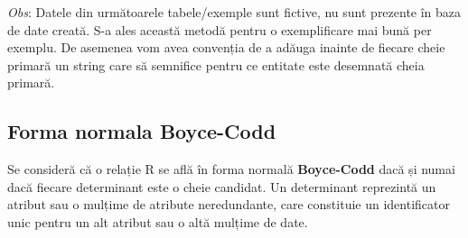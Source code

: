 \documentclass[12pt, a4paper]{article}
\begin{document}
\begin{table}[!htbp]
\begin{center}
\caption{Proiectia \emph{R1-2($X_1$, $X_2$, K)}}\label{tab11-2}
\end{center}
\end{table}

\begin{table}[!htbp]
\begin{center}
\caption{Proiectia \emph{R1-3($X_2$, $X_3$)}}\label{tab11-3}
\end{center}
\end{table}

\newpage
\emph{Obs}: Datele din următoarele tabele/exemple sunt fictive, nu sunt prezente în baza de date creată. S-a ales această metodă pentru o exemplificare mai bună per exemplu. De asemenea vom avea convenția de a adăuga inainte de fiecare cheie primară un string care să semnifice pentru ce entitate este desemnată cheia primară.

\subsection*{Forma normala Boyce-Codd}
Se consideră că o relație R se află în forma normală \textbf{Boyce-Codd} dacă și numai dacă fiecare determinant este o cheie candidat. Un determinant reprezintă un atribut sau o mulțime de atribute neredundante, care constituie un identificator unic pentru un alt atribut sau o altă mulțime de date.
\end{document}
